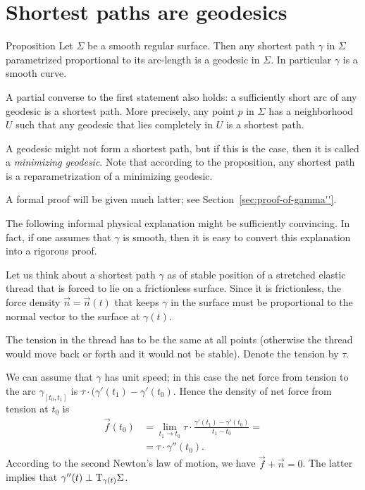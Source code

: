 \section{Shortest paths are geodesics}

\begin{thm}{Proposition}\label{prop:gamma''}
Let $\Sigma$ be a smooth regular surface.
Then any shortest path $\gamma$ in $\Sigma$ parametrized proportional to its arc-length is a geodesic in $\Sigma$.
In particular $\gamma$ is a smooth curve.

A partial converse to the first statement also holds: a sufficiently short arc of any geodesic is a shortest path.
More precisely, any point $p$ in $\Sigma$ has a neighborhood $U$ such that any geodesic that lies completely in $U$ is a shortest path.
\end{thm}

A geodesic might not form a shortest path, but if this is the case, then it is called a \emph{minimizing geodesic}.
Note that according to the proposition, any shortest path is a reparametrization of a minimizing geodesic.

A formal proof will be given much latter; see Section~\ref{sec:proof-of-gamma''}.

The following informal physical explanation might be sufficiently convincing.
In fact, if one assumes that $\gamma$ is smooth, then it is easy to convert this explanation into a rigorous proof.

Let us think about a shortest path $\gamma$ as of stable position of a stretched elastic thread that is forced to lie on a frictionless surface.
Since it is frictionless, the force density $\vec n=\vec n(t)$ that keeps $\gamma$ in the surface must be proportional to the normal vector to the surface at $\gamma(t)$.

The tension in the thread has to be the same at all points (otherwise the thread would move back or forth and it would not be stable).
Denote  the tension by $\tau$.

We can assume that $\gamma$ has unit speed;
in this case the net force from tension to the arc $\gamma_{[t_0,t_1]}$ is $\tau\cdot(\gamma'(t_1)-\gamma'(t_0)$.
Hence the density of net force from tension at $t_0$ is 
\begin{align*}
\vec f(t_0)&=\lim_{t_1\to t_0}\tau\cdot\frac{\gamma'(t_1)-\gamma'(t_0)}{t_1-t_0}=
\\
&=\tau\cdot\gamma''(t_0).
\end{align*}
According to the second Newton's law of motion, we have 
$\vec f+\vec n=0$.
The latter implies that  $\gamma''(t)\perp\mathrm{T}_{\gamma(t)}\Sigma$.
\qeds

